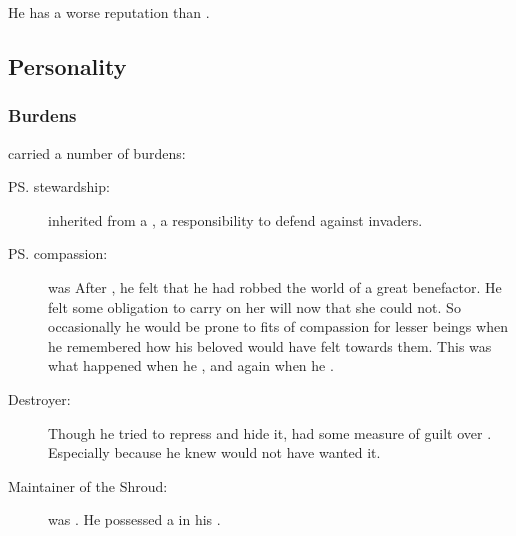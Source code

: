 He has a worse reputation than . 










\subsection{Personality}





\subsubsection{Burdens}
\Ishnaruchaefir carried a number of burdens:

\begin{description}
  \item[\ps{\Nexagglachel} stewardship:]
    \Ishnaruchaefir inherited from \Nexagglachel a , a responsibility to defend \Miith against invaders. 
  
  \item[\ps{\Rystessakhin} compassion:]
    \Rystessakhin was 
    After , he felt that he had robbed the world of a great benefactor. 
    He felt some obligation to carry on her will now that she could not.
    So occasionally he would be prone to fits of compassion for lesser beings when he remembered how his beloved would have felt towards them.
    This was what happened when he , and again when he .
  
  \item[Destroyer:]
    Though he tried to repress and hide it, \Ishnaruchaefir had some measure of guilt over . 
    Especially because he knew \Rystessakhin would not have wanted it.
  
  \item[Maintainer of the Shroud:]
    \Ishnaruchaefir was . 
    He possessed a  in his . 

\end{description}






